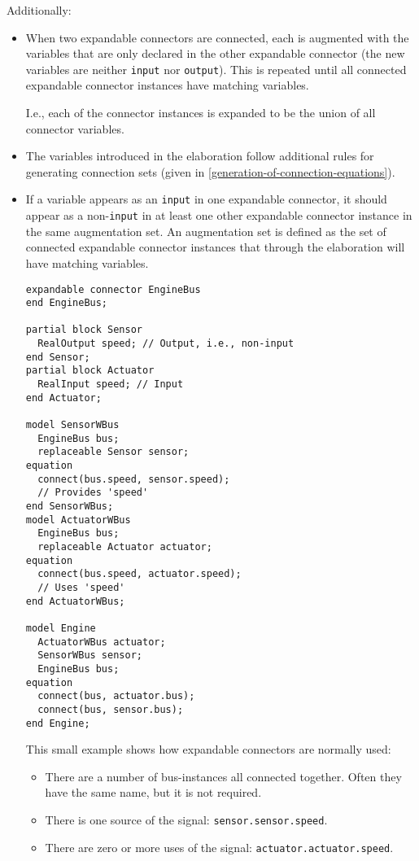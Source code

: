 Additionally:
\begin{itemize}
\item
  When two expandable connectors are connected, each is augmented with the variables that are only declared in the other expandable connector (the new variables are neither \lstinline!input! nor \lstinline!output!).
  This is repeated until all connected expandable connector instances have matching variables.
  \begin{nonnormative}
  I.e., each of the connector instances is expanded to be the union of all connector variables.
  \end{nonnormative}

\item
  The variables introduced in the elaboration follow additional rules for generating connection sets (given in \cref{generation-of-connection-equations}).

\item
  If a variable appears as an \lstinline!input! in one expandable connector, it should appear as a non-\lstinline!input! in at least one other expandable connector instance in the same augmentation set.
  An augmentation set is defined as the set of connected expandable connector instances that through the elaboration will have matching variables.
\begin{example}
\begin{lstlisting}[language=modelica]
expandable connector EngineBus
end EngineBus;

partial block Sensor
  RealOutput speed; // Output, i.e., non-input
end Sensor;
partial block Actuator
  RealInput speed; // Input
end Actuator;

model SensorWBus
  EngineBus bus;
  replaceable Sensor sensor;
equation
  connect(bus.speed, sensor.speed);
  // Provides 'speed'
end SensorWBus;
model ActuatorWBus
  EngineBus bus;
  replaceable Actuator actuator;
equation
  connect(bus.speed, actuator.speed);
  // Uses 'speed'
end ActuatorWBus;

model Engine
  ActuatorWBus actuator;
  SensorWBus sensor;
  EngineBus bus;
equation
  connect(bus, actuator.bus);
  connect(bus, sensor.bus);
end Engine;
\end{lstlisting}
This small example shows how expandable connectors are normally used:
\begin{itemize}
\item There are a number of bus-instances all connected together.
Often they have the same name, but it is not required.
\item There is one source of the signal: \lstinline!sensor.sensor.speed!.
\item There are zero or more uses of the signal:  \lstinline!actuator.actuator.speed!.
\end{itemize}
\end{example}


\end{itemize}
